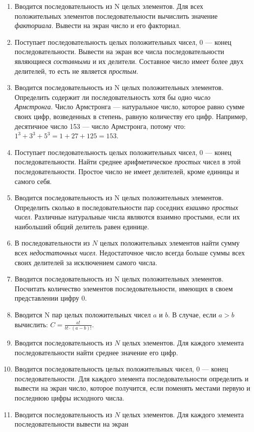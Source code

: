 \begin{enumerate}
\item Вводится последовательность из N целых элементов. Для всех положительных элементов последовательности вычислить
значение \emph{факториала}. Вывести на экран число и его факториал.
\item Поступает последовательность целых положительных чисел, 0 --- конец последовательности. Вывести на экран все числа
последовательности являющиеся \emph{составными} и их делители. Составное число имеет более двух делителей,
то есть не является \emph{простым}.
\item Вводится последовательность из N целых положительных элементов. Определить содержит ли последовательность хотя бы
одно \emph{число Армстронга}. Число Армстронга — натуральное число, которое равно сумме своих цифр,
возведенных в степень, равную количеству его цифр. Например, десятичное число 153 — число Армстронга, потому что: 
$1^3+3^3+5^3=1+27+125=153.$ 
\item Поступает последовательность целых положительных чисел, 0 --- конец последовательности. Найти среднее арифметическое
\emph{простых} чисел в этой последовательности. Простое число не имеет делителей, кроме единицы и самого
себя.
\item Вводится последовательность из N целых положительных элементов. Определить сколько в последовательности пар
соседних \emph{взаимно простых чисел}. Различные натуральные числа являются взаимно простыми, если их
наибольший общий делитель равен единице.
\item В последовательности из $N$ целых положительных элементов найти сумму всех \emph{недостаточных чисел}.
Недостаточное число всегда больше суммы всех своих делителей за исключением самого числа.
\item Вводится последовательность из N целых положительных элементов. Посчитать количество элементов последовательности,
имеющих в своем представлении цифру 0.
\item Вводится N пар целых положительных чисел $a$ и $b$. В случае, если
$a>b$ вычислить:
 $C=\frac{a!}{b!\cdot (a-b)!}$.
\item Вводится последовательность из $N$ целых элементов. Для каждого элемента последовательности найти среднее значение
его цифр.
\item Вводится последовательность целых положительных чисел, 0 --- конец последовательности. Для каждого элемента
последовательности определить и вывести на экран число, которое получится, если поменять местами первую и последнюю
цифры исходного числа.
\item Вводится последовательность из $N$ целых элементов. Для каждого элемента последовательности вывести на экран

\end{enumerate}
